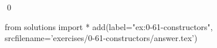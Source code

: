 
\begin{ex}
  \label{ex:0-61-constructors}
  
  \qed
\end{ex}
\begin{python0}
from solutions import *
add(label="ex:0-61-constructors",
    srcfilename='exercises/0-61-constructors/answer.tex')
\end{python0}
